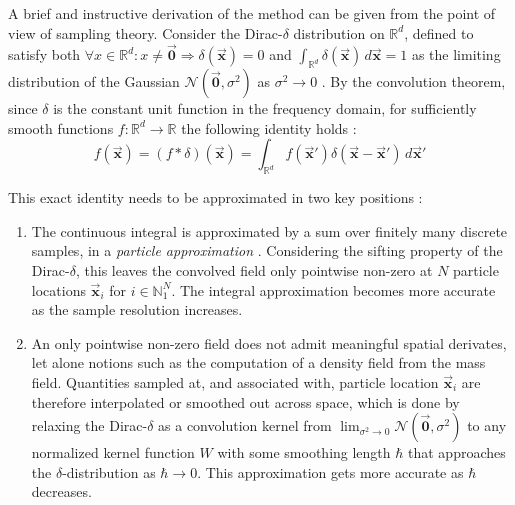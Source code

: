 \documentclass[conference]{IEEEtran}
\newcommand\vek[1]{\vec{\bm{#1}}}
\newcommand\br[1]{\left(#1\right)}
\begin{document}
A brief and instructive derivation of the method can be given from the point of view of sampling theory. Consider the Dirac-$\delta$ distribution on $\mathds{R}^d$, defined to satisfy both $\forall x\in\mathds{R}^d: x\neq \vek{0} \Longrightarrow \delta\br{\vek{x}} = 0$ and $\int_{\mathds{R}^d} \delta\br{\vek{x}} \, d\vek{x} = 1$ as the limiting distribution of the Gaussian $\mathcal{N}\br{\vek{0}, \sigma^2}$ as $\sigma^2\to 0$ \cite{tutorial2019}. By the convolution theorem, since $\delta$ is the constant unit function in the frequency domain, for sufficiently smooth functions $f: \mathds{R}^d\to\mathds{R}$ the following identity holds \cite{tutorial2019}:
\begin{equation}\label{eq:dirac-ident}
  f\br{\vek{x}} = (f \ast \delta)(\vek{x}) = \int_{\mathds{R}^d} f(\vek{x}') \delta(\vek{x}- \vek{x}')\,d\vek{x}'
\end{equation}

This exact identity needs to be approximated in two key positions \cite{tutorial2019}:
\begin{enumerate}
  \item The continuous integral is approximated by a sum over finitely many discrete samples, in a \textit{particle approximation} \cite{liu2010}. Considering the sifting property of the Dirac-$\delta$, this leaves the convolved field only pointwise non-zero at $N$ particle locations $\vek{x}_i$ for $i\in\mathds{N}_1^N$. The integral approximation becomes more accurate as the sample resolution increases.
  \item An only pointwise non-zero field does not admit meaningful spatial derivates, let alone notions such as the computation of a density field from the mass field. Quantities sampled at, and associated with, particle location $\vek{x}_i$ are therefore interpolated or smoothed out across space, which is done by relaxing the Dirac-$\delta$ as a convolution kernel from $\lim_{\sigma^2 \to 0} \mathcal{N}\br{\vek{0}, \sigma^2}$ to any normalized kernel function $W$ with some smoothing length $\hbar$ that approaches the $\delta$-distribution as $\hbar\to 0$. This approximation gets more accurate as $\hbar$ decreases.
\end{enumerate}
\end{document}
